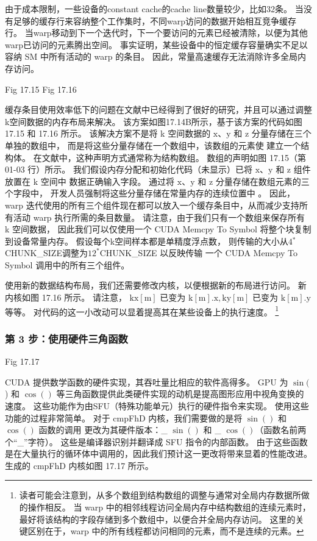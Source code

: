 由于成本限制，一些设备的constant cache的cache line数量较少，比如32条。 
当没有足够的缓存行来容纳整个工作集时，不同warp访问的数据开始相互竞争缓存行。 
当warp移动到下一个迭代时，下一个要访问的元素已经被清除，以便为其他warp已访问的元素腾出空间。 
事实证明，某些设备中的恒定缓存容量确实不足以容纳 SM 中所有活动的 warp 的条目。 
因此，常量高速缓存无法消除许多全局内存访问。

{\color{red} Fig 17.15}
{\color{red} Fig 17.16}

缓存条目使用效率低下的问题在文献中已经得到了很好的研究，并且可以通过调整k空间数据的内存布局来解决。 
该方案如图17.14B所示，基于该方案的代码如图  17.15 和 17.16 所示。 
该解决方案不是将 k 空间数据的 $\mathrm{x}、\mathrm{y}$ 和 $\mathrm{z}$ 分量存储在三个单独的数组中，
而是将这些分量存储在一个数组中，该数组的元素使 建立一个结构体。 在文献中，这种声明方式通常称为结构数组。 
数组的声明如图 17.15（第 01-03 行）所示。 
我们假设内存分配和初始化代码（未显示）已将 $\mathrm{x}、\mathrm{y}$ 和 $\mathrm{z}$ 组件
放置在 $\mathrm{k}$ 空间中 数据正确输入字段。 
通过将 $\mathrm{x}、\mathrm{y}$ 和 $\mathrm{z}$ 分量存储在数组元素的三个字段中，
开发人员强制将这些分量存储在常量内存的连续位置中 。 
因此，warp 迭代使用的所有三个组件现在都可以放入一个缓存条目中，从而减少支持所有活动 warp 执行所需的条目数量。 
请注意，由于我们只有一个数组来保存所有 k 空间数据，
因此我们可以仅使用一个 CUDA Memcpy To Symbol 将整个块复制到设备常量内存。 
假设每个k空间样本都是单精度浮点数，
则传输的大小从$4{}^{*}$CHUNK\_SIZE调整为$12^{*}$CHUNK\_SIZE
以反映传输 一个 CUDA Memcpy To Symbol 调用中的所有三个组件。

使用新的数据结构布局，我们还需要修改内核，以便根据新的布局进行访问。 新内核如图 17.16 所示。 
请注意， $\mathrm{kx}[\mathrm{m}]$ 已变为 $\mathrm{k}[\mathrm{m}].\mathrm{x}, \mathrm{ky}[\mathrm{m}]$ 已变为 $\mathrm{k}[\mathrm{m}].\mathrm{y}$ 等等。 
对代码的这一小改动可以显着提高其在某些设备上的执行速度。
\footnote{读者可能会注意到，从多个数组到结构数组的调整与通常对全局内存数据所做的操作相反。 
当 warp 中的相邻线程访问全局内存中结构数组的连续元素时，最好将该结构的字段存储到多个数组中，以便合并全局内存访问。 
这里的关键区别在于，warp 中的所有线程都访问相同的元素，而不是连续的元素。}

\subsubsection{第 3 步：使用硬件三角函数}
{\color{red} Fig 17.17}

CUDA 提供数学函数的硬件实现，其吞吐量比相应的软件高得多。 
GPU 为 $\sin ($ ) 和 $\cos ()$ 等三角函数提供此类硬件实现的动机是提高图形应用中视角变换的速度。 
这些功能作为由SFU（特殊功能单元）执行的硬件指令来实现。 使用这些功能的过程非常简单。 
对于 cmpFhD 内核，我们需要做的是将 $\sin ()$ 和 $\cos ()$ 函数的调用
更改为其硬件版本：\_ $\sin ()$ 和 \_ $ \cos ()$（函数名前两个“\_”字符）。 
这些是编译器识别并翻译成 SFU 指令的内部函数。 
由于这些函数是在大量执行的循环体中调用的，因此我们预计这一更改将带来显着的性能改进。 生成的 cmpFhD 内核如图 17.17 所示。

